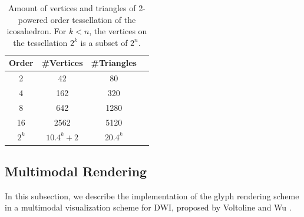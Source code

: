 \documentclass[twoside,twocolumn,10pt]{article}
\begin{document}
\begin{table}[]
\centering
\begin{tabular}{|c|c|c|c|}
\hline
\textbf{Order} & \textbf{\#Vertices} & \textbf{\#Triangles} \\ \hline
2              & 42                 & 80                 \\ \hline
4              & 162                & 320                 \\ \hline
8              & 642                & 1280                \\ \hline
16             & 2562               & 5120                \\ \hline
$2^k$          & $10.4^k + 2$ & $20.4^k$           \\ \hline
\end{tabular}
\caption{Amount of vertices and triangles of 2-powered order tessellation of the icosahedron. For $k<n$, the vertices on the tessellation $2^k$ is a subset of $2^n$.}
\label{tab::icosahedron_set}
\end{table}


\subsection{Multimodal Rendering}
\label{ssec::multimodal}

In this subsection, we describe the implementation of the glyph rendering scheme in a multimodal visualization scheme for DWI, proposed by Voltoline and Wu \cite{voltoline2021}. %




\end{document}
